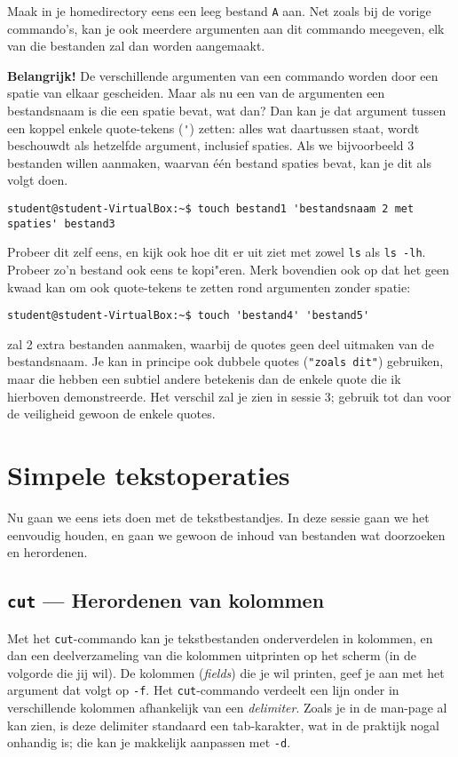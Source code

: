 \documentclass[a4paper,twoside,openany]{memoir}
\begin{document}
Maak in je homedirectory eens een leeg bestand \verb!A! aan. Net zoals bij de vorige commando's, kan je ook meerdere argumenten aan dit commando meegeven, elk van die bestanden zal dan worden aangemaakt.

\textbf{Belangrijk!} De verschillende argumenten van een commando worden door een spatie van elkaar gescheiden. Maar als nu een van de argumenten een bestandsnaam is die een spatie bevat, wat dan? Dan kan je dat argument tussen een koppel enkele quote-tekens (\verb!'!) zetten: alles wat daartussen staat, wordt beschouwdt als hetzelfde argument, inclusief spaties. Als we bijvoorbeeld 3 bestanden willen aanmaken, waarvan \'e\'en bestand spaties bevat, kan je dit als volgt doen.

\begin{verbatim}
student@student-VirtualBox:~$ touch bestand1 'bestandsnaam 2 met spaties' bestand3
\end{verbatim}

Probeer dit zelf eens, en kijk ook hoe dit er uit ziet met zowel \verb!ls! als \verb!ls -lh!. Probeer zo'n bestand ook eens te kopi"eren. Merk bovendien ook op dat het geen kwaad kan om ook quote-tekens te zetten rond argumenten zonder spatie:

\begin{verbatim}
student@student-VirtualBox:~$ touch 'bestand4' 'bestand5'
\end{verbatim}

zal 2 extra bestanden aanmaken, waarbij de quotes geen deel uitmaken van de bestandsnaam. Je kan in principe ook dubbele quotes (\verb!"zoals dit"!) gebruiken, maar die hebben een subtiel andere betekenis dan de enkele quote die ik hierboven demonstreerde. Het verschil zal je zien in sessie 3; gebruik tot dan voor de veiligheid gewoon de enkele quotes.

\chapter{Simpele tekstoperaties}

Nu gaan we eens iets doen met de tekstbestandjes. In deze sessie gaan we het eenvoudig houden, en gaan we gewoon de inhoud van bestanden wat doorzoeken en herordenen.

\section{\texttt{cut} --- Herordenen van kolommen}

Met het \verb!cut!-commando kan je tekstbestanden onderverdelen in kolommen, en dan een deelverzameling van die kolommen uitprinten op het scherm (in de volgorde die jij wil). De kolommen (\emph{fields}) die je wil printen, geef je aan met het argument dat volgt op \verb!-f!. Het \verb!cut!-commando verdeelt een lijn onder in verschillende kolommen afhankelijk van een \emph{delimiter}. Zoals je in de man-page al kan zien, is deze delimiter standaard een tab-karakter, wat in de praktijk nogal onhandig is; die kan je makkelijk aanpassen met \verb!-d!.
\end{document}
